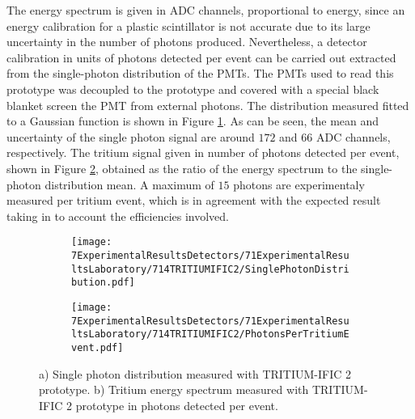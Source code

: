 The energy spectrum is given in ADC channels, proportional to energy, since an energy calibration for a plastic scintillator is not accurate due to its large uncertainty in the number of photons produced. Nevertheless, a detector calibration in units of photons detected per event can be carried out extracted from the single-photon distribution of the PMTs. The PMTs used to read this prototype was decoupled to the prototype and covered with a special black blanket screen the PMT from external photons. The distribution measured fitted to a Gaussian function is shown in Figure \ref{subfig:SinglePhotonDistributionIFIC2}. As can be seen, the mean and uncertainty of the single photon signal are around $172$ and $66$ ADC channels, respectively. The tritium signal given in number of photons detected per event, shown in Figure \ref{subfig:TritiumSignalTRITIUMIFIC2}, obtained as the ratio of the energy spectrum to the single-photon distribution mean. A maximum of $15$ photons are experimentaly measured per tritium event, which is in agreement with the expected result taking in to account the efficiencies involved. 

\begin{figure}
\centering
    \begin{subfigure}[b]{0.73\textwidth}
    \centering
    \texttt{[image: 7ExperimentalResultsDetectors/71ExperimentalResultsLaboratory/714TRITIUMIFIC2/SinglePhotonDistribution.pdf]}  
    \caption{\label{subfig:SinglePhotonDistributionIFIC2}}
    \end{subfigure}
    \hfill
    \begin{subfigure}[b]{0.73\textwidth}
    \centering
    \texttt{[image: 7ExperimentalResultsDetectors/71ExperimentalResultsLaboratory/714TRITIUMIFIC2/PhotonsPerTritiumEvent.pdf]}  
    \caption{\label{subfig:TritiumSignalTRITIUMIFIC2}}
    \end{subfigure}
 \caption{a) Single photon distribution measured with TRITIUM-IFIC 2 prototype. b) Tritium energy spectrum measured with TRITIUM-IFIC 2 prototype in photons detected per event.}
 \label{fig:PhotonsPerTritiumEventIFIC2}
\end{figure}


